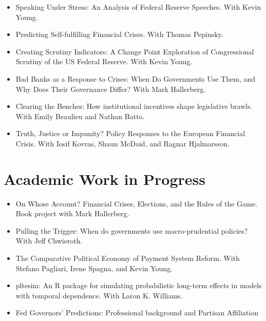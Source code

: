 \documentclass[a4paper]{article}
\begin{document}
{\begin{itemize}
    \item Speaking Under Stress: An Analysis of Federal Reserve Speeches. With Kevin Young.

    \item Predicting Self-fulfilling Financial Crises. With Thomas Pepinsky.

    \item Creating Scrutiny Indicators: A Change Point Exploration of Congressional Scrutiny of the US Federal Reserve. With Kevin Young.

    \item Bad Banks as a Response to Crises: When Do Governments Use Them, and Why Does Their Governance Differ? With Mark Hallerberg.

    \item Clearing the Benches: How institutional incentives shape legislative brawls. With Emily Beaulieu and Nathan Batto.

    \item Truth, Justice or Impunity? Policy Responses to the European Financial Crisis. With Iosif Kovras, Shaun McDaid, and Ragnar Hjalmarsson.

\end{itemize}

\section*{Academic Work in Progress}

\begin{itemize}

    \item On Whose Account? Financial Crises, Elections, and the Rules of the Game. Book project with Mark Hallerberg.

    \item Pulling the Trigger: When do governments use macro-prudential policies? With Jeff Chwieroth.

    \item The Comparative Political Economy of Payment System Reform. With Stefano Pagliari, Irene Spagna, and Kevin Young.

    \item pltesim: An R package for simulating probabilistic long-term effects in models with temporal dependence. With Laron K. Williams.

    \item Fed Governors' Predictions: Professional background and Partisan Affiliation


\end{itemize}}
\end{document}

